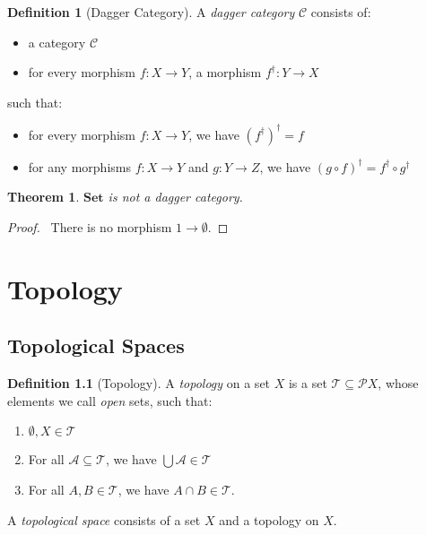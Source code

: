 \documentclass{book}
\newtheorem{thm}[lm]{Theorem}
\theoremstyle{definition}
\newtheorem{df}[lm]{Definition}
\newcommand{\Set}{\ensuremath{\mathbf{Set}}}
\begin{document}
  \begin{df}[Dagger Category]
    A \emph{dagger category} $\mathcal{C}$ consists of:
    \begin{itemize}
      \item a category $\mathcal{C}$
      \item for every morphism $f : X \rightarrow Y$, a morphism $f^\dagger : Y 
      \rightarrow X$
    \end{itemize}
    such that:
    \begin{itemize}
      \item for every morphism $f : X \rightarrow Y$, we have 
      $(f^\dagger)^\dagger = 
      f$
      \item for any morphisms $f : X \rightarrow Y$ and $g : Y \rightarrow Z$, 
      we 
      have $(g \circ f)^\dagger = f^\dagger \circ g^\dagger$
    \end{itemize}
  \end{df}
  
  \begin{thm}
    $\Set$ is not a dagger category.
  \end{thm}
  
  \begin{proof}
    \pf\ There is no morphism $1 \rightarrow \emptyset$.
  \end{proof}
  
  \chapter{Topology}
  
  \section{Topological Spaces}
  
  \begin{df}[Topology]
    A \emph{topology} on a set $X$ is a set $\mathcal{T} \subseteq \mathcal{P}
    X$, whose elements we call \emph{open} sets, such that:
    \begin{enumerate}
      \item $\emptyset, X \in \mathcal{T}$
      \item For all $\mathcal{A} \subseteq \mathcal{T}$, we have $\bigcup
      \mathcal{A} \in \mathcal{T}$
      \item For all $A, B \in \mathcal{T}$, we have $A \cap B \in \mathcal{T}$.
    \end{enumerate}
    A \emph{topological space} consists of a set $X$ and a topology on $X$.
  \end{df}
  
\end{document}
